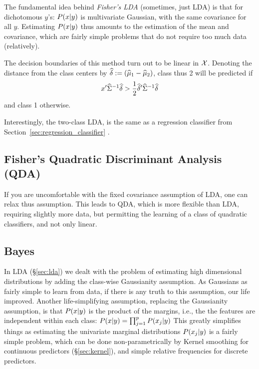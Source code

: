 The fundamental idea behind \emph{Fisher's LDA} (sometimes, just LDA) is that for dichotomous $y$'s: $P(x|y)$ is multivariate Gaussian, with the same covariance for all $y$.
Estimating $P(x|y)$ thus amounts to the estimation of the mean and covariance, which are fairly simple problems that do not require too much data (relatively).

The decision boundaries of this method turn out to be linear in $\mathcal{X}$. 
Denoting the distance from the class centers by $\widehat{\delta}:=(\widehat{\mu}_1-\widehat{\mu}_2)$, class thus 2 will be predicted if 
\begin{align}
	x' \widehat{\Sigma}^{-1} \widehat{\delta} > \frac{1}{2} \widehat{\delta}' \widehat{\Sigma}^{-1} \widehat{\delta}
\end{align}
and class 1 otherwise.


\begin{remark}
Interestingly, the two-class LDA, is the same as a regression classifier from  Section~\ref{sec:regression_classifier} \cite[Eq. 4.11 ]{hastie_elements_2003}.
\end{remark}



\subsection{Fisher's Quadratic Discriminant Analysis (QDA)}
\label{sec:qda}
If you are uncomfortable with the fixed covariance assumption of LDA, one can relax thus assumption.
This leads to QDA, which is more flexible than LDA, requiring slightly more data, but permitting the learning of a class of quadratic classifiers, and not only linear.






\subsection{\Naive Bayes}
\label{sec:naive_bayes}

In LDA (\S\ref{sec:lda}) we dealt with the problem of estimating high dimensional distributions by adding the class-wise Gaussianity assumption. As Gaussians as fairly simple to learn from data, if there is any truth to this assumption, our life improved. 
Another life-simplifying assumption, replacing the Gaussianity assumption, is that $P(x|y)$ is the product of the margins, i.e., the the features are independent within each class: $P(x|y)=\prod_{j=1}^pP(x_j|y)$
This greatly simplifies things as estimating the univariate marginal distributions $P(x_j|y)$ is a fairly simple problem, which can be done non-parametrically by Kernel smoothing for continuous predictors (\S\ref{sec:kernel}), and simple relative frequencies for discrete predictors. 




